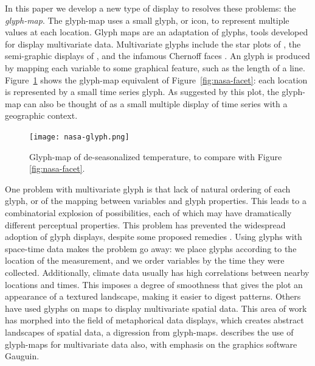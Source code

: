 \documentclass[oneside]{article}
\begin{document}

In this paper we develop a new type of display to resolves these problems: the \emph{glyph-map}. The glyph-map uses a small glyph, or icon, to represent multiple values at each location. Glyph maps are an adaptation of glyphs, tools developed for display multivariate data. Multivariate glyphs include the star plots of \citet{mayr:1877}, the semi-graphic displays of \citet{anderson:1960}, and the infamous Chernoff faces \citep{chernoff:1973}. An glyph is produced by mapping each variable to some graphical feature, such as the length of a line. Figure~\ref{fig:nasa-glyph} shows the glyph-map equivalent of Figure~\ref{fig:nasa-facet}: each location is represented by a small time series glyph. As suggested by this plot, the glyph-map can also be thought of as a small multiple display \citet{tufte:2001} of time series with a geographic context.


\begin{figure}[htbp]
  \centering
  \texttt{[image: nasa-glyph.png]}
  \caption{Glyph-map of de-seasonalized temperature, to compare with Figure \ref{fig:nasa-facet}. }
  \label{fig:nasa-glyph}
\end{figure}

One problem with multivariate glyph is that lack of natural ordering of each glyph, or of the mapping between variables and glyph properties. This leads to a combinatorial explosion of possibilities, each of which may have dramatically different perceptual properties. This problem has prevented the widespread adoption of glyph displays, despite some proposed remedies \citep{kleiner:1981,hurley:2010}. Using glyphs with space-time data makes the problem go away: we place glyphs according to the location of the measurement, and we order variables by the time they were collected. Additionally, climate data usually has high correlations between nearby locations and times. This imposes a degree of smoothness that gives the plot an appearance of a textured  landscape, making it easier to digest patterns. Others \citet{pickett:1988} have used glyphs on maps to display multivariate spatial data. This area of work has morphed into the field of metaphorical data displays, which creates abstract landscapes of spatial data, a digression from glyph-maps. \citet{gribov:2006} describes the use of glyph-maps for multivariate data also, with emphasis on the graphics software Gauguin.
\end{document}
